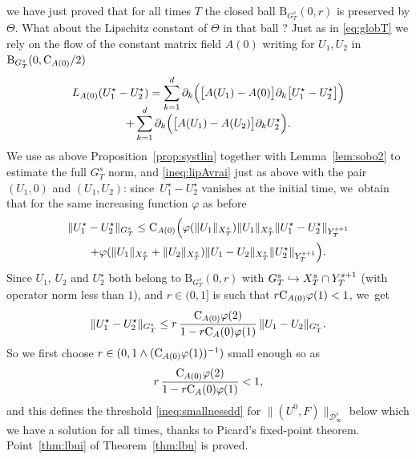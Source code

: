 \documentclass[10pt]{amsart}
\newcommand\hto{\mathrel{\lhook\joinrel\to}}
\theoremstyle{definition}
\newcommand\B{\mathrm{B}}
\let\ffi\varphi
\begin{document}
we have just proved that for all times $T$ the closed ball $\B_{G_T^s}(0,r)$ is preserved by $\Theta$. What about the Lipschitz constant of $\Theta$ in that ball ? Just as in \eqref{eq:globT} we rely on the flow of the constant matrix field $A(0)$ writing for $U_1,U_2$ in $\B_{G_T^s}(0,\textnormal{C}_{A(0)}/2)$\vspace*{-5pt}
\begin{multline*}
L_{A(0)}(U_1^\star-U_2^\star) = \sum_{k=1}^d \partial_k\Bigl(\bigl[A(U_1)-A(0)\bigr]\partial_k \bigl[U_1^\star-U_2^\star\bigr]\Bigr) \\[-8pt]
+ \sum_{k=1}^d \partial_k\Bigl(\bigl[A(U_1)-A(U_2)\bigr]\partial_k U_2^\star\Bigr).
\end{multline*}
We use as above Proposition~\ref{prop:systlin} together with Lemma~\ref{lem:sobo2} to estimate the full $G_T^s$ norm, and \eqref{ineq:lipAvrai} just as above with the pair $(U_1,0)$ and $(U_1,U_2)$: since~$U_1^\star-U_2^\star$ vanishes at the initial time, we~obtain that for the same increasing function $\ffi$ as before\vspace*{-5pt}
\begin{multline*}
\|U_1^\star-U_2^\star\|_{G_T^s}\leq \textnormal{C}_{A(0)} \Bigl(\ffi(\|U_1\|_{X_T^s})\|U_1\|_{X_T^s}\|U_1^\star-U_2^\star\|_{Y_T^{s+1}} \\
+ \ffi(\|U_1\|_{X_T^s}+\|U_2\|_{X_T^s})\|U_1-U_2\|_{X_T^s}\|U_2^\star\|_{Y_T^{s+1}}\Bigr).
\end{multline*}
Since $U_1$, $U_2$ and $U_2^\star$ both belong to $\B_{G_T^s}(0,r)$ with $G_T^s\hto X_T^s\cap Y_T^{s+1}$ (with operator norm less than $1$), and $r\in(0,1]$ is such that $r\textnormal{C}_{A(0)}\ffi(1)<1$, we~get
\[
\|U_1^\star-U_2^\star\|_{G_T^s} \leq r\,\frac{\textnormal{C}_{A(0)}\ffi(2)}{1-r\textnormal{C}_A(0)\ffi(1)}\, \|U_1-U_2\|_{G_T^s}.
\]
So we first choose $r\in(0,1\wedge(\textnormal{C}_{A(0)}\ffi(1))^{-1})$ small enough so as
\[
r\,\frac{\textnormal{C}_{A(0)}\ffi(2)}{1-r\textnormal{C}_A(0)\ffi(1)}<1,
\]
and this defines the threshold \eqref{ineq:smallnessdd} for $ \| (U^0,F)\| _{\mathcal D_\infty^{s}}$ below which we have a solution for all times, thanks to Picard's fixed-point theorem. Point~\eqref{thm:lbui} of Theorem~\ref{thm:lbu} is proved.
\end{document}
